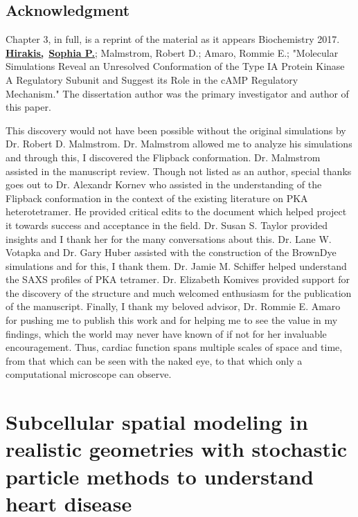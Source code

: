 \documentclass[12pt]{ucsddissertation}
\begin{document}
\section{Acknowledgment}
Chapter 3, in full, is a reprint of the material as it appears Biochemistry 2017. 
\textbf{\underline{Hirakis,}}\ \textbf{\underline{Sophia P.}}; Malmstrom, Robert D.; Amaro, Rommie E.; "Molecular Simulations Reveal an Unresolved Conformation of the Type IA Protein Kinase A Regulatory Subunit and Suggest its Role in the cAMP Regulatory Mechanism." The dissertation author was the primary investigator and author of this paper.

This discovery would not have been possible without the original simulations by Dr. Robert D. Malmstrom. Dr. Malmstrom allowed me to analyze his simulations and through this, I discovered the Flipback conformation. Dr. Malmstrom assisted in the manuscript review. Though not listed as an author, special thanks goes out to Dr. Alexandr Kornev who assisted in the understanding of the Flipback conformation in the context of the existing literature on PKA heterotetramer. He provided critical edits to the document which helped project it towards success and acceptance in the field. Dr. Susan S. Taylor provided insights and I thank her for the many conversations about this. Dr. Lane W. Votapka and Dr. Gary Huber assisted with the construction of the BrownDye simulations and for this, I thank them. Dr. Jamie M. Schiffer helped understand the SAXS profiles of PKA tetramer. Dr. Elizabeth Komives provided support for the discovery of the structure and much welcomed enthusiasm for the publication of the manuscript. Finally, I thank my beloved advisor, Dr. Rommie E. Amaro for pushing me to publish this work and for helping me to see the value in my findings, which the world may never have known of if not for her invaluable encouragement. Thus, cardiac function spans multiple scales of space and time, from that which can be seen with the naked eye, to that which only a computational microscope can observe.





\chapter{Subcellular spatial modeling in realistic geometries with stochastic particle methods to understand heart disease}
\end{document}
